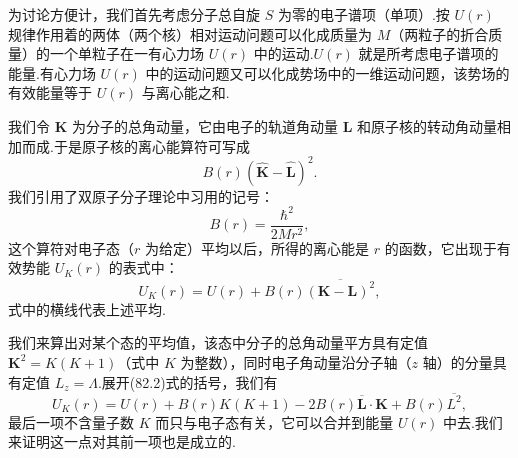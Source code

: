 为讨论方便计，我们首先考虑分子总自旋 $S$ 为零的电子谱项（单项）.按 $U(r)$ 规律作用着的两体（两个核）相对运动问题可以化成质量为 $M$（两粒子的折合质量）的一个单粒子在一有心力场 $U(r)$ 中的运动.$U(r)$ 就是所考虑电子谱项的能量.有心力场 $U(r)$ 中的运动问题又可以化成势场中的一维运动问题，该势场的有效能量等于 $U(r)$ 与离心能之和.

我们令 $\boldsymbol{K}$ 为分子的总角动量，它由电子的轨道角动量 $\boldsymbol{L}$ 和原子核的转动角动量相加而成.于是原子核的离心能算符可写成
\begin{equation*}
  B(r)(\hat{\boldsymbol{K}}-\hat{\boldsymbol{L}})^2.
\end{equation*}
我们引用了双原子分子理论中习用的记号：
\begin{equation}
  B(r)=\frac{\hbar^2}{2Mr^2},
\end{equation}
这个算符对电子态（$r$ 为给定）平均以后，所得的离心能是 $r$ 的函数，它出现于有效势能 $U_K(r)$ 的表式中：
\begin{equation}
  U_K(r)=U(r)+B(r)\overline{(\boldsymbol{K}-\boldsymbol{L})^2},
\end{equation}
式中的横线代表上述平均.

我们来算出对某个态的平均值，该态中分子的总角动量平方具有定值 $\boldsymbol{K}^2=K(K+1)$（式中 $K$ 为整数），同时电子角动量沿分子轴（$z$ 轴）的分量具有定值 $L_z=\Lambda$.展开(82.2)式的括号，我们有
\begin{equation}
  U_K(r)=U(r)+B(r)K(K+1)-2B(r)\overline{\boldsymbol{L}}\cdot\boldsymbol{K}
  +B(r)\overline{L^2},
\end{equation}
最后一项不含量子数 $K$ 而只与电子态有关，它可以合并到能量 $U(r)$ 中去.我们来证明这一点对其前一项也是成立的.

